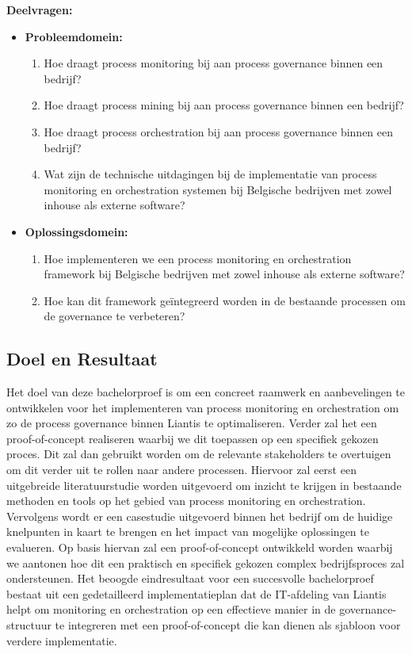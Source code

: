 \textbf{Deelvragen:}
\begin{itemize}
    \item \textbf{Probleemdomein:}
    \begin{enumerate}
        \item Hoe draagt process monitoring bij aan process governance binnen een bedrijf?
        \item Hoe draagt process mining bij aan process governance binnen een bedrijf?
        \item Hoe draagt process orchestration bij aan process governance binnen een bedrijf?
        \item Wat zijn de technische uitdagingen bij de implementatie van process monitoring en orchestration systemen bij Belgische bedrijven met zowel inhouse als externe software?
    \end{enumerate}
    
    \item \textbf{Oplossingsdomein:}
    \begin{enumerate}
        \item Hoe implementeren we een process monitoring en orchestration framework bij Belgische bedrijven met zowel inhouse als externe software?
        \item Hoe kan dit framework geïntegreerd worden in de bestaande processen om de governance te verbeteren?
    \end{enumerate}
\end{itemize}

\subsection{Doel en Resultaat}

Het doel van deze bachelorproef is om een concreet raamwerk en aanbevelingen te ontwikkelen voor het implementeren van process monitoring en orchestration om zo de process governance binnen Liantis te optimaliseren. Verder zal het een proof-of-concept realiseren waarbij we dit toepassen op een specifiek gekozen proces. Dit zal dan gebruikt worden om de relevante stakeholders te overtuigen om dit verder uit te rollen naar andere processen.  Hiervoor zal eerst een uitgebreide literatuurstudie worden uitgevoerd om inzicht te krijgen in bestaande methoden en tools op het gebied van process monitoring en orchestration. Vervolgens wordt er een casestudie uitgevoerd binnen het bedrijf om de huidige knelpunten in kaart te brengen en het impact van mogelijke oplossingen te evalueren. Op basis hiervan zal een proof-of-concept ontwikkeld worden waarbij we aantonen hoe dit een praktisch en specifiek gekozen complex bedrijfsproces zal ondersteunen. Het beoogde eindresultaat voor een succesvolle bachelorproef bestaat uit een gedetailleerd implementatieplan dat de IT-afdeling van Liantis helpt om monitoring en orchestration op een effectieve manier in de governance-structuur te integreren met een proof-of-concept die kan dienen als sjabloon voor verdere implementatie. 

